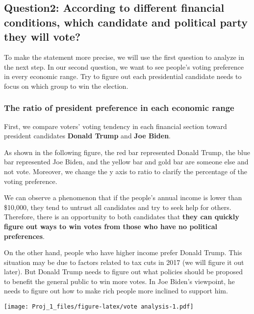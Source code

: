 \documentclass[
]{article}
\begin{document}
\hypertarget{question2-according-to-different-financial-conditions-which-candidate-and-political-party-they-will-vote}{%
\subsection{Question2: According to different financial conditions,
which candidate and political party they will
vote?}\label{question2-according-to-different-financial-conditions-which-candidate-and-political-party-they-will-vote}}

To make the statement more precise, we will use the first question to
analyze in the next step. In our second question, we want to see
people's voting preference in every economic range. Try to figure out
each presidential candidate needs to focus on which group to win the
election.

\hypertarget{the-ratio-of-president-preference-in-each-economic-range}{%
\subsubsection{The ratio of president preference in each economic
range}\label{the-ratio-of-president-preference-in-each-economic-range}}

First, we compare voters' voting tendency in each financial section
toward president candidates \textbf{Donald Trump} and \textbf{Joe
Biden}.

As shown in the following figure, the red bar represented Donald Trump,
the blue bar represented Joe Biden, and the yellow bar and gold bar are
someone else and not vote. Moreover, we change the y axis to ratio to
clarify the percentage of the voting preference.

We can observe a phenomenon that if the people's annual income is lower
than \$10,000, they tend to untrust all candidates and try to seek help
for others. Therefore, there is an opportunity to both candidates that
\textbf{they can quickly figure out ways to win votes from those who
have no political preferences}.

On the other hand, people who have higher income prefer Donald Trump.
This situation may be due to factors related to tax cuts in 2017 (we
will figure it out later). But Donald Trump needs to figure out what
policies should be proposed to benefit the general public to win more
votes. In Joe Biden's viewpoint, he needs to figure out how to make rich
people more inclined to support him.

\texttt{[image: Proj\_1\_files/figure-latex/vote analysis-1.pdf]}
\end{document}
